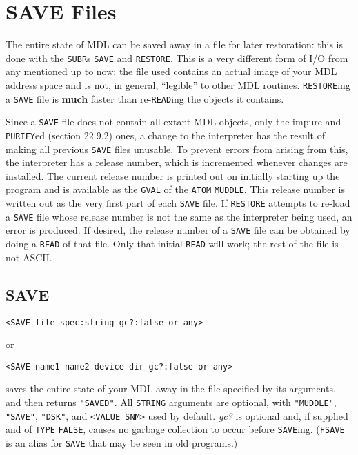 \documentclass[a4paper]{scrbook}
\begin{document}
\section{SAVE Files}\label{save-files}

The entire state of MDL can be saved away in a file for later restoration: this is done with the \texttt{SUBR}s
\texttt{SAVE}  and \texttt{RESTORE}. This is a very different form of I/O from
any mentioned up to now; the file used contains an actual image of your MDL address space and is not, in general,
``legible'' to other MDL routines. \texttt{RESTORE}ing a \texttt{SAVE} file is \textbf{much} faster than
re-\texttt{READ}ing the objects it contains.

Since a \texttt{SAVE} file does not contain all extant MDL objects, only the impure and \texttt{PURIFY}ed
 (section 22.9.2) ones, a change to the interpreter has the result of making all previous
\texttt{SAVE} files unusable. To prevent errors from arising from this, the interpreter has a release number, which is
incremented whenever changes are installed. The current release number is printed out on initially starting up the program
and is available as the \texttt{GVAL} of the \texttt{ATOM} \texttt{MUDDLE}. This release
number is written out as the very first part of each \texttt{SAVE} file. If \texttt{RESTORE} attempts to re-load a
\texttt{SAVE} file whose release number is not the same as the interpreter being used, an error is produced. If desired,
the release number of a \texttt{SAVE} file can be obtained by doing a \texttt{READ} of that file. Only that initial
\texttt{READ} will work; the rest of the file is not ASCII.

\subsection{SAVE}\label{save}

\begin{verbatim}
<SAVE file-spec:string gc?:false-or-any>
\end{verbatim}

or

\begin{verbatim}
<SAVE name1 name2 device dir gc?:false-or-any>
\end{verbatim}

 saves the entire state of your MDL away in the file specified by its arguments, and then
returns \texttt{"SAVED"}. All \texttt{STRING} arguments are optional, with \texttt{"MUDDLE"},
 \texttt{"SAVE"},  \texttt{"DSK"},
 and \texttt{\textless{}VALUE\ SNM\textgreater{}}  used by default. \emph{gc?}
is optional and, if supplied and of \texttt{TYPE} \texttt{FALSE}, causes no garbage collection to occur before
\texttt{SAVE}ing. (\texttt{FSAVE}  is an alias for \texttt{SAVE} that may be seen in old programs.)
\end{document}
